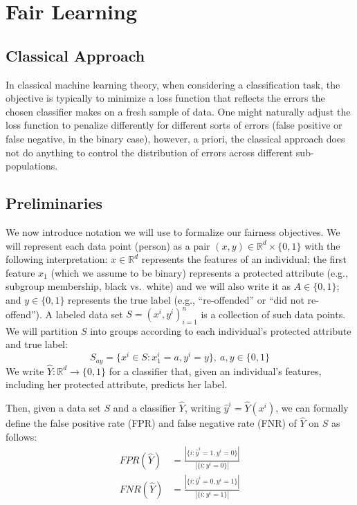\section{Fair Learning}
\subsection{Classical Approach}
In classical machine learning theory, when considering a classification task, the objective is typically to minimize a loss function that reflects the errors the chosen classifier makes on a fresh sample of data. One might naturally adjust the loss function to penalize differently for different sorts of errors (false positive or false negative, in the binary case), however, a priori, the classical approach does not do anything to control the distribution of errors across different sub-populations.

\subsection{Preliminaries}
We now introduce notation we will use to formalize our fairness objectives. We will represent each data point (person) as a pair $(x, y) \in \mathbb{R}^d \times \{0,1\}$ with the following interpretation: $x \in \mathbb{R}^d$ represents the features of an individual; the first feature $x_1$ 
(which we assume to be binary) represents a protected attribute (e.g., subgroup membership, black vs.~white) and we will also write it as $A \in \{0,1\}$; and $y \in \{0, 1\}$ represents the true label (e.g., ``re-offended'' or ``did not re-offend''). A labeled data set $S=(x^i,y^i)_{i=1}^n$ is a collection of such data points. We will partition $S$ into groups according to each individual's protected attribute and true label:
\begin{equation*}
S_{ay} = \{x^i \in S : x^i_1=a, y^i=y\}, ~a,y \in \{0,1\}
\end{equation*}
We write $\hat{Y}: \mathbb{R}^d\rightarrow \{0,1\}$ for a classifier that, given an individual's features, including her protected attribute, predicts her label.

Then, given a data set $S$ and a classifier $\hat{Y}$, writing $\hat{y}^i = \hat{Y}(x^i)$, we can formally define the false positive rate (FPR) and false negative rate (FNR) of $\hat{Y}$ on $S$ as follows:
\begin{align*}
FPR(\hat{Y}) &= \frac{\left|\{i:\hat{y}^i=1,y^i=0\}\right|}{\left|\{i: y^i=0\}\right|}\\
FNR(\hat{Y}) &= \frac{\left|\{i:\hat{y}^i=0,y^i=1\}\right|}{\left|\{i:y^i=1\}\right|}
\end{align*}

